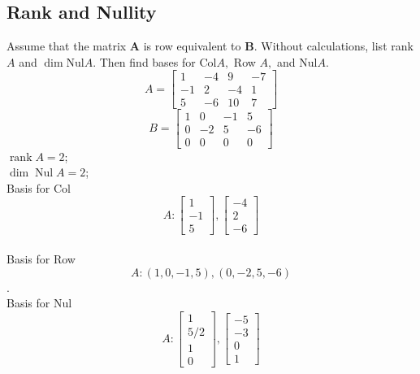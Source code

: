 \begin{enumerate}[(a)]
    \subsection{Rank and Nullity}
    Assume that the matrix $\mathbf{A}$ is row equivalent to $\mathbf{B}$. Without calculations, list rank $A$ and $\operatorname{dim} \mathrm{Nul} A$. Then find bases for $\mathrm{Col} A,$ Row $A,$ and $\mathrm{Nul} A$.
    $$A=\left[\begin{array}{rrrr}1 & -4 & 9 & -7 \\ -1 & 2 & -4 & 1 \\ 5 & -6 & 10 & 7\end{array}\right]$$
    \[
    B=\left[\begin{array}{rrrr}
    1 & 0 & -1 & 5 \\
    0 & -2 & 5 & -6 \\
    0 & 0 & 0 & 0
    \end{array}\right]
    \]
    $\operatorname{rank} A=2$;\\
    $\operatorname{dim} \operatorname{Nul} A=2$;\\
    Basis for Col
    $$A:\left[\begin{array}{r}1 \\ -1 \\ 5\end{array}\right],\left[\begin{array}{r}-4 \\ 2 \\ -6\end{array}\right]$$\\
    Basis for Row $$A:(1,0,-1,5),(0,-2,5,-6)$$.\\
    Basis for Nul $$A:\left[\begin{array}{c}1 \\ 5 / 2 \\ 1 \\ 0\end{array}\right],\left[\begin{array}{r}-5 \\ -3 \\ 0 \\ 1\end{array}\right]$$
\end{enumerate}